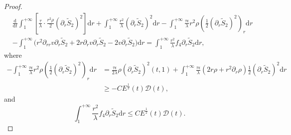 \documentclass[10pt,reqno]{amsart}
\numberwithin{equation}{section}
\begin{document}
\begin{proof}
		\begin{equation}\label{30}
			\begin{aligned}
				&\frac{\mathrm{d}}{\mathrm{d} t}\int_{1}^{+\infty}\left[\frac{\tau }{\lambda} \cdot \frac{r^2 \rho}{2}(\partial_r \tilde{S}_2)^2\right]\mathrm{d}r
				+\int_{1}^{+\infty}\frac{r^2}{\lambda}(\partial_r \tilde{S}_2)^2\mathrm{d}r
				-\int_{1}^{+\infty}\frac{\tau \epsilon }{\lambda}r^2\rho(\frac{1}{2}(\partial_r \tilde{S}_2)^2)_r\mathrm{d}r\\
				&-\int_{1}^{+\infty}\bigg(r^2\partial_{rr}v\partial_r \tilde{S}_2+2r\partial_{r}v\partial_r \tilde{S}_2
				-2v\partial_r \tilde{S}_2\bigg)\mathrm{d}r
				=\int_{1}^{+\infty}\frac{r^2}{\lambda}f_4\partial_r \tilde{S}_2\mathrm{d}r,
			\end{aligned}
		\end{equation}
		where
		\begin{equation}
			\begin{aligned}
				\nonumber
				-\int_{1}^{+\infty}\frac{\tau \epsilon }{\lambda}r^2\rho(\frac{1}{2}(\partial_r\tilde{S}_2)^2)_r\mathrm{d}r
				&=\frac{\tau \epsilon }{2\lambda}\rho (\partial_r\tilde{S}_2)^2(t,1)
				+\int_{1}^{+\infty}\frac{\tau \epsilon }{\lambda}(2r\rho+r^2\partial_{r}\rho)\frac{1}{2}(\partial_r\tilde{S}_2)^2\mathrm{d}r\\
				&\geq-C E^{\frac{1}{2}}(t) \mathcal{D}(t),
			\end{aligned}
		\end{equation}
		and
		\begin{equation}\nonumber
			\int_{1}^{+\infty}\frac{r^2}{\lambda}f_4\partial_r \tilde{S}_2\mathrm{d}r\leq C E^{\frac{1}{2}}(t) \mathcal{D}(t).
		\end{equation}
		

\end{proof}
\end{document}
